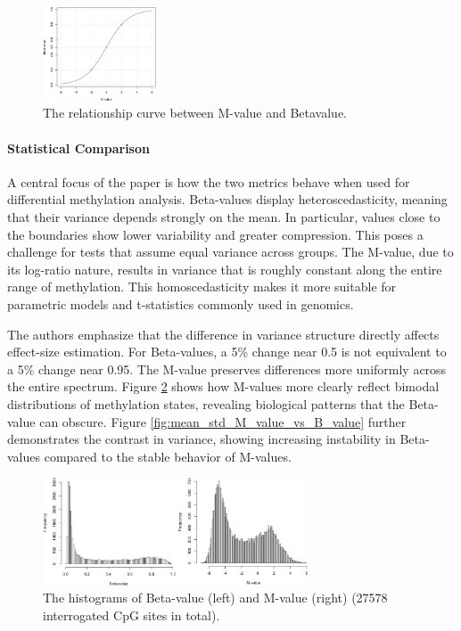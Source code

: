 \documentclass[10pt]{extarticle}
\begin{document}
\begin{figure}[h]
    \centering
    \includegraphics[width=0.3\textwidth]{Figures/The relationship curve between M-value and Betavalue.jpg} %
    \caption{The relationship curve between M-value and Betavalue.}
    \label{fig:M_value_vs_B_value}
\end{figure}

\paragraph{Statistical Comparison}
A central focus of the paper is how the two metrics behave when used for differential methylation analysis. Beta-values display heteroscedasticity, meaning that their variance depends strongly on the mean. In particular, values close to the boundaries show lower variability and greater compression. This poses a challenge for tests that assume equal variance across groups. The M-value, due to its log-ratio nature, results in variance that is roughly constant along the entire range of methylation. This homoscedasticity makes it more suitable for parametric models and t-statistics commonly used in genomics.

The authors emphasize that the difference in variance structure directly affects effect-size estimation. For Beta-values, a 5\% change near 0.5 is not equivalent to a 5\% change near 0.95. The M-value preserves differences more uniformly across the entire spectrum. Figure \ref{fig:histo_M_value_vs_B_value} shows how M-values more clearly reflect bimodal distributions of methylation states, revealing biological patterns that the Beta-value can obscure. Figure \ref{fig:mean_std_M_value_vs_B_value} further demonstrates the contrast in variance, showing increasing instability in Beta-values compared to the stable behavior of M-values.

\begin{figure}[h]
    \centering
    \includegraphics[width=0.7\textwidth]{Figures/The histograms of Beta-value (left) and M-value (right) (27578 interrogated CpG sites in total)..jpg} %
    \caption{The histograms of Beta-value (left) and M-value (right) (27578 interrogated CpG sites in total).}
    \label{fig:histo_M_value_vs_B_value}
\end{figure}
\end{document}
